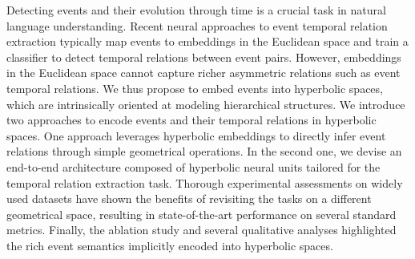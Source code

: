 Detecting events and their evolution through time is a crucial task in natural language understanding. Recent neural approaches to event temporal relation extraction typically map events to embeddings in the Euclidean space and train a classifier to detect temporal relations between event pairs. However, embeddings in the Euclidean space cannot capture richer asymmetric relations such as event temporal relations. We thus propose to embed events into hyperbolic spaces, which are intrinsically oriented at modeling hierarchical structures. We introduce two approaches to encode events and their temporal relations in hyperbolic spaces. One approach leverages hyperbolic embeddings to directly infer event relations through simple geometrical operations. In the second one, we devise an end-to-end architecture composed of hyperbolic neural units tailored for the temporal relation extraction task. Thorough experimental assessments on widely used datasets have shown the benefits of revisiting the tasks on a different geometrical space, resulting in state-of-the-art performance on several standard metrics. Finally, the ablation study and several qualitative analyses highlighted the rich event semantics implicitly encoded into hyperbolic spaces.
